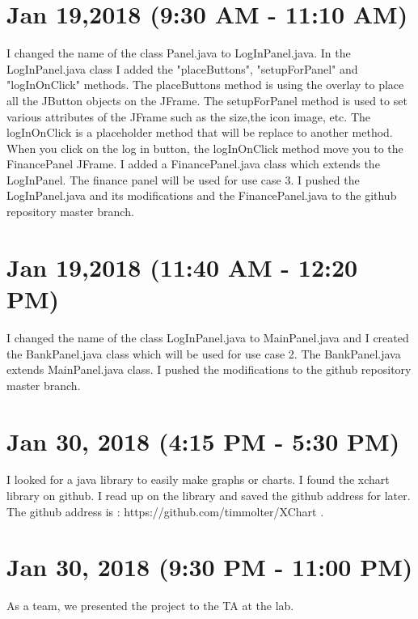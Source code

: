\documentclass{article}
\begin{document}
\section{Jan 19,2018 (9:30 AM - 11:10 AM)}
I changed the name of the class Panel.java to LogInPanel.java. In the LogInPanel.java class I added the "placeButtons", "setupForPanel" and "logInOnClick" methods. The placeButtons method is using the overlay to place all the JButton objects on the JFrame. The setupForPanel method is used to set various attributes of the JFrame such as the size,the icon image, etc. The logInOnClick is a placeholder method that will be replace to another method. When you click on the log in button, the logInOnClick method move you to the FinancePanel JFrame. I added a FinancePanel.java class which extends the LogInPanel. The finance panel will be used for use case 3. I pushed the LogInPanel.java and its modifications and the FinancePanel.java to the github repository master branch.
\section{Jan 19,2018 (11:40 AM - 12:20 PM)}
I changed the name of the class LogInPanel.java to MainPanel.java and I created the BankPanel.java class which will be used for use case 2. The BankPanel.java extends MainPanel.java class. I pushed the modifications to the github repository master branch.
\section{Jan 30, 2018 (4:15 PM - 5:30 PM)}
I looked for a java library to easily make graphs or charts. I found the xchart library on github. I read up on the library and saved the github address for later. The github address is : https://github.com/timmolter/XChart .
\section{Jan 30, 2018 (9:30 PM - 11:00 PM)}
As a team, we presented the project to the TA at the lab.
\end{document}
